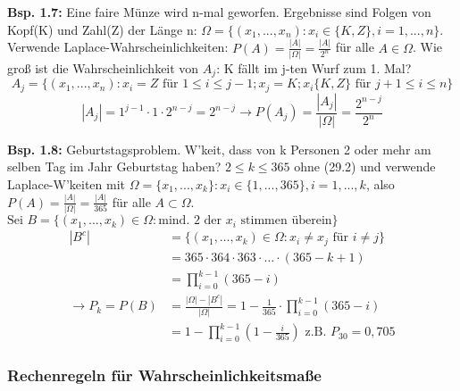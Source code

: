 \documentclass[a4paper,11pt]{article}
\begin{document}
\vspace{6pt}
\noindent\textbf{Bsp. 1.7:} Eine faire Münze wird n-mal geworfen. 
Ergebnisse sind Folgen von Kopf(K) und Zahl(Z) der Länge n: $\Omega = \{(x_1,...,x_n): x_i\in\{K,Z\}, i = 1,...,n\}$. 
Verwende Laplace-Wahrscheinlichkeiten: $P(A)=\frac{|A|}{|\Omega|}=\frac{|A|}{2^n}$ für alle $A\in\Omega$.
Wie groß ist die Wahrscheinlichkeit von $A_j$: \glqq K fällt im j-ten Wurf zum 1. Mal\grqq?
\[A_j = \{(x_1,...,x_n): x_i=Z \text{ für } 1 \leq i \leq j-1; x_j=K; x_i \{K,Z\} \text{ für } j+1 \leq i \leq n\}\]
\[|A_j| = 1^{j-1}\cdot 1\cdot 2^{n-j}=2^{n-j} \rightarrow P(A_j) = \frac{|A_j|}{|\Omega|}= \frac{2^{n-j}}{2^{n}}\]

\noindent\textbf{Bsp. 1.8:} Geburtstagsproblem.
W'keit, dass von k Personen 2 oder mehr am selben Tag im Jahr Geburtstag haben?
$2 \leq k \leq 365$ ohne (29.2) und verwende Laplace-W'keiten mit $\Omega=\{x_1,...,x_k\}: x_i \in \{1,...,365\}, i=1,...,k$, also 
$P(A)=\frac{|A|}{|\Omega|}=\frac{|A|}{365}$ für alle $A\subset\Omega$.
$\text{Sei }B=\{(x_1,...,x_k) \in\Omega: \text{mind. 2 der } x_i \text{ stimmen überein}\}$
\begin{align*}
    |B^c| &= \{(x_1, \dots ,x_k) \in \Omega: x_i \neq x_j \text{ für }i \neq j\} \\
    &= 365 \cdot 364 \cdot 363 \cdot\dots\cdot (365-k+1) \\
    &= \prod_{i=0}^{k-1}(365-i) \\
    \rightarrow P_k = P(B) &= \frac{|\Omega| - |B^c|}{|\Omega|} = 1 - \frac{1}{365}\cdot \prod_{i=0}^{k-1}(365-i) \\
    &= 1 - \prod_{i=0}^{k-1}(1-\frac{i}{365}) \text{           z.B. } P_{30} = 0,705
\end{align*}

\subsubsection{Rechenregeln für Wahrscheinlichkeitsmaße}
\end{document}
